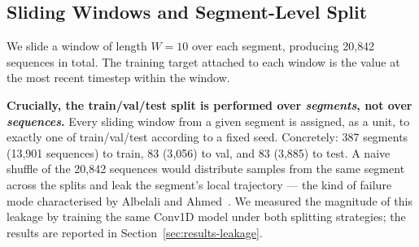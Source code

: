 \documentclass[conference]{IEEEtran}
\begin{document}
\subsection{Sliding Windows and Segment-Level Split}
\label{sec:split}
We slide a window of length $W{=}10$ over each segment, producing
20{,}842 sequences in total. The training target attached to each
window is the value at the most recent timestep within the window.

\textbf{Crucially, the train/val/test split is performed over
\emph{segments}, not over \emph{sequences}.} Every sliding window
from a given segment is assigned, as a unit, to exactly one of
train/val/test according to a fixed seed. Concretely: 387 segments
(13{,}901 sequences) to train, 83 (3{,}056) to val, and 83 (3{,}885)
to test. A naive shuffle of the 20{,}842 sequences would distribute
samples from the same segment across the splits and leak the
segment's local trajectory --- the kind of failure mode characterised
by Albelali and Ahmed~\cite{albelali2025hidden}. We measured the
magnitude of this leakage by training the same Conv1D model under both
splitting strategies; the results are reported in
Section~\ref{sec:results-leakage}.
\end{document}
